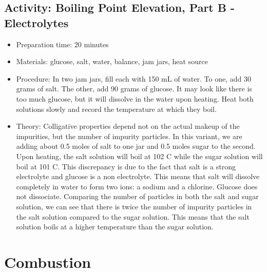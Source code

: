 \begin{itemize}
{\subsection{Activity: Boiling Point Elevation, Part B - Electrolytes}
\begin{itemize}
\item{Preparation time: 20 minutes}
\item{Materials: glucose, salt, water, balance, jam jars, heat source}
\item{Procedure: In two jam jars, fill each with 150 mL of water. To one, add 30 grams of salt. The other, add 90 grams of glucose. It may look like there is too much glucose, but it will dissolve in the water upon heating. Heat both solutions slowly and record the temperature at which they boil.}
\item{Theory: Colligative properties depend not on the actual makeup of the impurities, but the number of impurity particles. In this variant, we are adding about 0.5 moles of salt to one jar and 0.5 moles sugar to the second. Upon heating, the salt solution will boil at 102 C while the sugar solution will boil at 101 C. This discrepancy is due to the fact that salt is a strong electrolyte and glucose is a non electrolyte. This means that salt will dissolve completely in water to form two ions: a sodium and a chlorine. Glucose does not dissociate. Comparing the number of particles in both the salt and sugar solution, we can see that there is twice the number of impurity particles in the salt solution compared to the sugar solution. This means that the salt solution boils at a higher temperature than the sugar solution.}
\end{itemize}

\section{Combustion}

}
\end{itemize}

